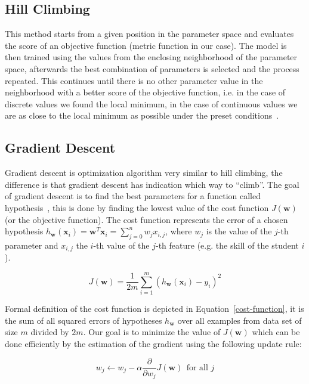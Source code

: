 \subsection{Hill Climbing}
\label{hill-climbing}

This method starts from a given position in the parameter space and evaluates the score of an objective function (metric function in our case). The model is then trained using the values from the enclosing neighborhood of the parameter space, afterwards the best combination of parameters is selected and the process repeated. This continues until there is no other parameter value in the neighborhood with a better score of the objective function, i.e. in the case of discrete values we found the local minimum, in the case of continuous values we are as close to the local minimum as possible under the preset conditions~\cite{Russell2009}.

\subsection{Gradient Descent}
\label{gradient-descent}

Gradient descent is optimization algorithm very similar to hill climbing, the difference is that gradient descent has indication which way to ``climb''. The goal of gradient descent is to find the best parameters for a function called hypothesis~\cite{Klusasek2014}, this is done by finding the lowest value of the cost function $J(\mathbf{w})$ (or the objective function). The cost function represents the error of a chosen hypothesis $h_{\mathbf{w}}(\mathbf{x}_i) = \mathbf{w}^T \mathbf{x}_i = \sum^n_{j=0} w_j x_{i,j}$, where $w_j$ is the value of the $j$-th parameter and $x_{i,j}$ the $i$-th value of the $j$-th feature (e.g. the skill of the student $i$).

\begin{equation} \label{cost-function}
  J(\mathbf{w}) = \frac{1}{2m} \sum^m_{i=1} (h_{\mathbf{w}}(\mathbf{x}_i) - y_i)^2
\end{equation}

Formal definition of the cost function is depicted in Equation~\ref{cost-function}, it is the sum of all squared errors of hypotheses $h_{\mathbf{w}}$ over all examples from data set of size $m$ divided by $2m$. Our goal is to minimize the value of $J(\mathbf{w})$ which can be done efficiently by the estimation of the gradient using the following update rule:

\begin{equation} \label{cost-function-update}
  w_j \gets w_j - \alpha \frac{\partial}{\partial w_j} J(\mathbf{w})~~\text{for all } j
\end{equation}

